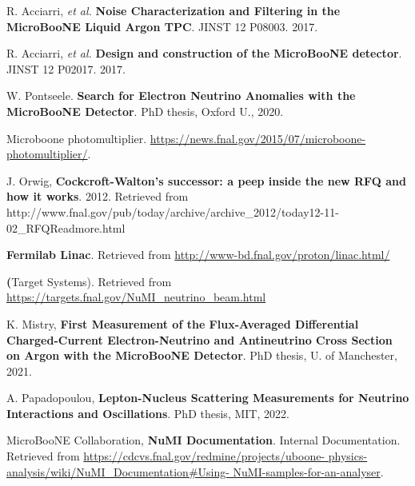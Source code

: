  R. Acciarri, \textit{et al.} \textbf{Noise Characterization and Filtering in the MicroBooNE Liquid Argon TPC}. JINST 12 P08003. 2017.

 R. Acciarri, \textit{et al.} \textbf{Design and construction of the MicroBooNE detector}. JINST 12 P02017. 2017. 

 W. Pontseele. \textbf{Search for Electron Neutrino Anomalies with the MicroBooNE Detector}. PhD thesis, Oxford U., 2020.

 Microboone photomultiplier. \href{https://news.fnal.gov/2015/07/microboone- photomultiplier/}{https://news.fnal.gov/2015/07/microboone- photomultiplier/}.

 J. Orwig, \textbf{Cockcroft-Walton's successor: a peep inside the new RFQ and how it works}. 2012. Retrieved from http://www.fnal.gov/pub/today/archive/archive\_2012/today12-11-02\_RFQReadmore.html

 \textbf{Fermilab Linac}. Retrieved from \url{http://www-bd.fnal.gov/proton/linac.html/}

 \textbf(Target Systems). Retrieved from \url{https://targets.fnal.gov/NuMI_neutrino_beam.html}

 K. Mistry, \textbf{First Measurement of the Flux-Averaged Differential Charged-Current Electron-Neutrino and Antineutrino Cross Section on Argon with the MicroBooNE Detector}. PhD thesis, U. of Manchester, 2021. 

 A. Papadopoulou, \textbf{Lepton-Nucleus Scattering Measurements for Neutrino Interactions and Oscillations}. PhD thesis, MIT, 2022. 

 MicroBooNE Collaboration, \textbf{NuMI Documentation}. Internal Documentation. Retrieved from \url{https://cdcvs.fnal.gov/redmine/projects/uboone- physics-analysis/wiki/NuMI_Documentation#Using- NuMI-samples-for-an-analyser}. 
